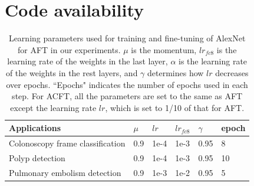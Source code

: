 \chapter{Code availability}
\label{ap2}

\newpage

\begin{table}[b]
\footnotesize 
\begin{center}
\begin{threeparttable}
\caption[Learning Parameters for Active, Continual Fine-Tuning]{
Learning parameters used for training and fine-tuning of AlexNet for AFT in our experiments. $\mu$ is the momentum, $lr_{fc8}$ is the learning rate of the weights in the last layer, $\alpha$ is the learning rate of the weights in the rest layers, and $\gamma$ determines how $lr$ decreases over epochs. ``Epochs" indicates the number of epochs used in each step. For ACFT, all the parameters are set to the same as AFT except the learning rate $lr$, which is set to 1/10 of that for AFT.}
\label{ap2:tab:hyperparameter}
\begin{tabular}{p{}P{0.09\textwidth}P{0.09\textwidth}P{0.09\textwidth}P{0.09\textwidth}P{0.09\textwidth}}
\hline
Applications & $\mu$ & $lr$ & $lr_{fc8}$ & $\gamma$ & epoch \\
\hline
Colonoscopy frame classification & 0.9 & 1e-4 & 1e-3 & 0.95 & 8 \\
Polyp detection & 0.9 & 1e-4 & 1e-3 & 0.95 & 10 \\
Pulmonary embolism detection & 0.9 & 1e-3 & 1e-2 & 0.95 & 5 \\
\hline
\end{tabular}
\end{threeparttable}
\end{center}
\end{table}

